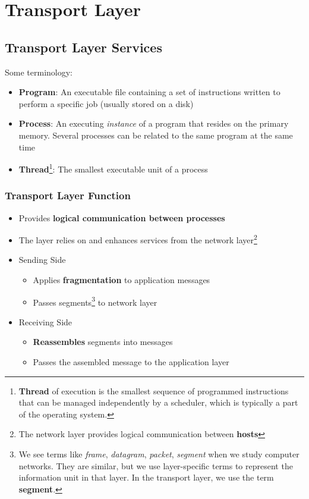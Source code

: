 \section{Transport Layer}
\subsection{Transport Layer Services}
Some terminology:
\begin{itemize}
	\item \textbf{Program}: An executable file containing a set of instructions written to perform a specific job (usually stored on a disk)
	\item \textbf{Process}: An executing \textit{instance} of a program that resides on the primary memory. Several processes can be related to the same program at the same time
	\item \textbf{Thread}\footnote{\textbf{Thread} of execution is the smallest sequence of programmed instructions that can be managed independently by a scheduler, which is typically a part of the operating system.}: The smallest executable unit of a process
\end{itemize}

\subsubsection{Transport Layer Function}
\begin{itemize}
	\item Provides \textbf{logical communication between processes}
	\item The layer relies on and enhances services from the network layer\footnote{The network layer provides logical communication between \textbf{hosts}}
	\item Sending Side
	\begin{itemize}
		\item Applies \textbf{fragmentation} to application messages
		\item Passes segments\footnote{We see terms like \textit{frame}, \textit{datagram}, \textit{packet}, \textit{segment} when we study computer networks. They are similar, but we use layer-specific terms to represent the information unit in that layer. In the transport layer, we use the term \textbf{segment}.} to network layer
	\end{itemize}
	\item Receiving Side
	\begin{itemize}
		\item \textbf{Reassembles} segments into messages
		\item Passes the assembled message to the application layer
	\end{itemize}
\end{itemize}


